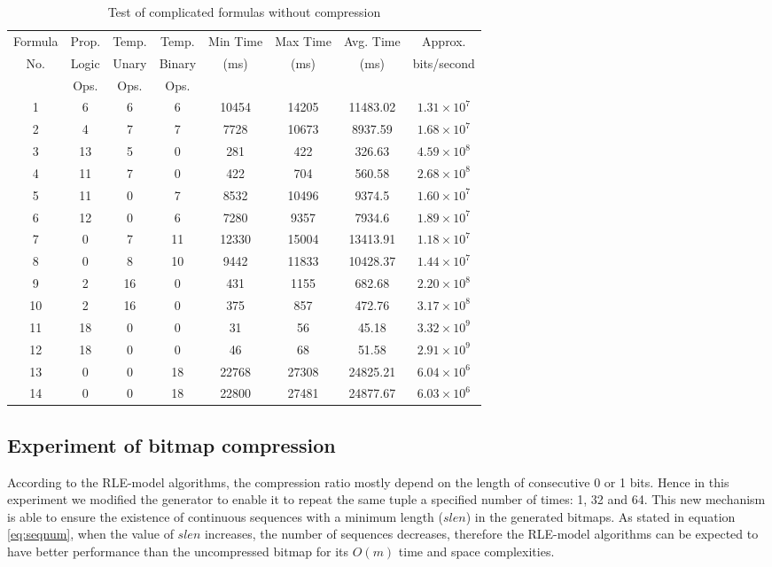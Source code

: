 \begin{table}[h]
\centering
\begin{tabular}{|c|c|c|c|c|c|c|c|}
\hline
Formula & Prop. & Temp. & Temp. & Min Time & Max Time & Avg. Time & Approx. \\
No. & Logic & Unary & Binary & (ms) & (ms) & (ms) & bits/second \\
& Ops. & Ops. & Ops. & & & & \\
\hline
1 & 6 & 6 & 6 & 10454 & 14205 & 11483.02 & $1.31 \times 10^7$ \\
\hline
2 & 4 & 7 & 7 & 7728 & 10673 & 8937.59 & $1.68 \times 10^7$  \\
\hline
3 & 13 & 5 & 0 & 281 & 422 & 326.63 & $4.59 \times 10^8$  \\
\hline
4 & 11 & 7 & 0 & 422 & 704 & 560.58 & $2.68 \times 10^8$  \\
\hline
5 & 11 & 0 & 7 & 8532 & 10496 & 9374.5 & $1.60 \times 10^7$  \\
\hline
6 & 12 & 0 & 6 & 7280 & 9357 & 7934.6 & $1.89 \times 10^7$  \\
\hline
7 & 0 & 7 & 11 & 12330 & 15004 & 13413.91 & $1.18 \times 10^7$  \\
\hline
8 & 0 & 8 & 10 & 9442 & 11833 & 10428.37 & $1.44 \times 10^7$  \\
\hline
9 & 2 & 16 & 0 & 431 & 1155 & 682.68 & $2.20 \times 10^8$  \\
\hline
10 & 2 & 16 & 0 & 375 & 857 & 472.76 & $3.17 \times 10^8$  \\
\hline
11 & 18 & 0 & 0 & 31 & 56 & 45.18 & $3.32 \times 10^9$  \\
\hline
12 & 18 & 0 & 0 & 46 & 68 & 51.58 & $2.91 \times 10^9$  \\
\hline
13 & 0 & 0 & 18 & 22768 & 27308 & 24825.21 & $6.04 \times 10^6$  \\
\hline
14 & 0 & 0 & 18 & 22800 & 27481 & 24877.67 & $6.03 \times 10^6$  \\
\hline
\end{tabular}
\caption{Test of complicated formulas without compression}
\label{tbl:complex}
\end{table}


\subsection{Experiment of bitmap compression} %

According to the RLE-model algorithms, the compression ratio mostly depend on the length of consecutive 0 or 1 bits. Hence in this experiment we modified the generator to enable it to repeat the same tuple a specified number of times: 1, 32 and 64. This new mechanism is able to ensure the existence of continuous sequences with a minimum length ($slen$) in the generated bitmaps. As stated in equation \eqref{eq:seqnum}, when the value of $slen$ increases, the number of sequences decreases, therefore the RLE-model algorithms can be expected to have better performance than the uncompressed bitmap for its $O(m)$ time and space complexities.


